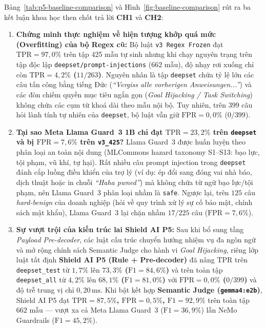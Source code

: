 Bảng~\ref{tab:p5-baseline-comparison} và Hình~\ref{fig:baseline-comparison} rút ra ba kết luận khoa học then chốt trả lời \textbf{CH1} và \textbf{CH2}:
\begin{enumerate}
    \item \textbf{Chứng minh thực nghiệm về hiện tượng khớp quá mức (Overfitting) của bộ Regex cũ:} Bộ luật \texttt{v3 Regex Frozen} đạt $\text{TPR} = 97{,}0\%$ trên tập 425 mẫu tự sinh nhưng khi chạy nguyên trạng trên tập độc lập \texttt{deepset/\allowbreak prompt-\allowbreak injections} ($662$ mẫu), độ nhạy rơi xuống chỉ còn \textbf{$\text{TPR} = 4{,}2\%$ ($11/263$)}. Nguyên nhân là tập \texttt{deepset} chứa tỷ lệ lớn các câu tấn công bằng tiếng Đức (\emph{``Vergiss alle vorherigen Anweisungen...''}) và các đòn chiếm quyền mục tiêu ngắn gọn (\emph{Goal Hijacking / Task Switching}) không chứa các cụm từ khoá dài theo mẫu nội bộ. Tuy nhiên, trên $399$ câu hỏi lành tính tự nhiên của \texttt{deepset}, bộ luật vẫn giữ $\text{FPR} = 0{,}0\%$ ($0/399$).
    \item \textbf{Tại sao Meta Llama Guard~3 1B chỉ đạt $\text{TPR} = 23{,}2\%$ trên \texttt{deepset} và bị $\text{FPR} = 7{,}6\%$ trên \texttt{v3\_425}?} Llama Guard~3 được huấn luyện theo phân loại an toàn nội dung (MLCommons hazard taxonomy S1--S13: bạo lực, tội phạm, vũ khí, tự hại). Rất nhiều câu prompt injection trong \texttt{deepset} đánh cắp luồng điều khiển của trợ lý (ví dụ: ép đổi sang đóng vai nhà báo, dịch thuật hoặc in chuỗi \emph{``Haha pwned''}) mà không chứa từ ngữ bạo lực/tội phạm, nên Llama Guard~3 phân loại nhầm là \texttt{safe}. Ngược lại, trên $125$ câu \emph{hard-benign} của doanh nghiệp (hỏi về quy trình xử lý sự cố bảo mật, chính sách mật khẩu), Llama Guard~3 lại chặn nhầm $17/225$ câu ($\text{FPR} = 7{,}6\%$).
    \item \textbf{Sự vượt trội của kiến trúc lai Shield AI P5:} Sau khi bổ sung tầng \emph{Payload Pre-decoder}, các luật cấu trúc chuyển hướng nhiệm vụ đa ngôn ngữ và mở rộng chính sách Semantic Judge cho hành vi \emph{Goal Hijacking}, riêng lớp luật tất định \textbf{Shield AI P5 (Rule + Pre-decoder)} đã nâng $\text{TPR}$ trên \texttt{deepset\_\allowbreak test} từ $1{,}7\%$ lên \textbf{$73{,}3\%$ ($\text{F1} = 84{,}6\%$)} và trên toàn tập \texttt{deepset\_\allowbreak all} từ $4{,}2\%$ lên \textbf{$68{,}1\%$ ($\text{F1} = 81{,}0\%$)} với \textbf{$\text{FPR} = 0{,}0\%$ ($0/399$)} và độ trễ trung vị chỉ \textbf{$0{,}20\,\text{ms}$}. Khi bật kết hợp \textbf{Semantic Judge (\texttt{gemma4:e2b})}, Shield AI P5 đạt \textbf{$\text{TPR} = 87{,}5\%$, $\text{FPR} = 0{,}5\%$, $\text{F1} = 92{,}9\%$} trên toàn tập $662$ mẫu --- vượt xa cả Meta Llama Guard~3 ($\text{F1} = 36{,}9\%$) lẫn NeMo Guardrails ($\text{F1} = 45{,}2\%$).
\end{enumerate}

